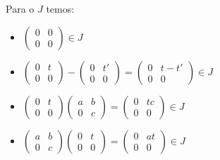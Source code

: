 \documentclass[10pt,a4paper]{article}
\begin{document}
\noindent
Para o $J$ temos:
\begin{itemize}
\item $\begin{pmatrix}
0&0\\0&0
\end{pmatrix}\in J$
\item $\begin{pmatrix}
0&t\\0&0
\end{pmatrix}-\begin{pmatrix}
0&t'\\0&0
\end{pmatrix}=\begin{pmatrix}
0&t-t'\\0&0
\end{pmatrix}\in J$
\item $\begin{pmatrix}
0&t\\0&0
\end{pmatrix}\begin{pmatrix}
a&b\\0&c
\end{pmatrix}=\begin{pmatrix}
0&tc\\0&0
\end{pmatrix}\in J$
\item $\begin{pmatrix}
a&b\\0&c
\end{pmatrix}\begin{pmatrix}
0&t\\0&0
\end{pmatrix}=\begin{pmatrix}
0&at\\0&0
\end{pmatrix}\in J$
\end{itemize}
\end{document}
